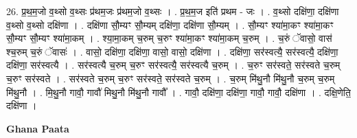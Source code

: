 \documentclass[17pt]{extarticle}
\begin{document}
26. प्र॒थ॒म॒जो व॒थ्सो व॒थ्सः प्र॑थम॒जः प्र॑थम॒जो व॒थ्सः । . प्र॒थ॒म॒ज इति॑ प्रथम - जः । . व॒थ्सो दक्षि॑णा॒ दक्षि॑णा व॒थ्सो व॒थ्सो दक्षि॑णा । . दक्षि॑णा सौ॒म्यꣳ सौ॒म्यम् दक्षि॑णा॒ दक्षि॑णा सौ॒म्यम् । . सौ॒म्यꣳ श्या॑मा॒कꣳ श्या॑मा॒कꣳ सौ॒म्यꣳ सौ॒म्यꣳ श्या॑मा॒कम् । . श्या॒मा॒कम् च॒रुम् च॒रुꣳ श्या॑मा॒कꣳ श्या॑मा॒कम् च॒रुम् । . च॒रुं ॅवासो॒ वास॑ श्च॒रुम् च॒रुं ॅवासः॑ । . वासो॒ दक्षि॑णा॒ दक्षि॑णा॒ वासो॒ वासो॒ दक्षि॑णा । . दक्षि॑णा॒ सर॑स्वत्यै॒ सर॑स्वत्यै॒ दक्षि॑णा॒ दक्षि॑णा॒ सर॑स्वत्यै । . सर॑स्वत्यै च॒रुम् च॒रुꣳ सर॑स्वत्यै॒ सर॑स्वत्यै च॒रुम् । . च॒रुꣳ सर॑स्वते॒ सर॑स्वते च॒रुम् च॒रुꣳ सर॑स्वते । . सर॑स्वते च॒रुम् च॒रुꣳ सर॑स्वते॒ सर॑स्वते च॒रुम् । . च॒रुम् मि॑थु॒नौ मि॑थु॒नौ च॒रुम् च॒रुम् मि॑थु॒नौ । . मि॒थु॒नौ गावौ॒ गावौ॑ मिथु॒नौ मि॑थु॒नौ गावौ᳚ । . गावौ॒ दक्षि॑णा॒ दक्षि॑णा॒ गावौ॒ गावौ॒ दक्षि॑णा । . दक्षि॒णेति॒ दक्षि॑णा । \newline

\textbf{Ghana Paata } \newline
\end{document}
